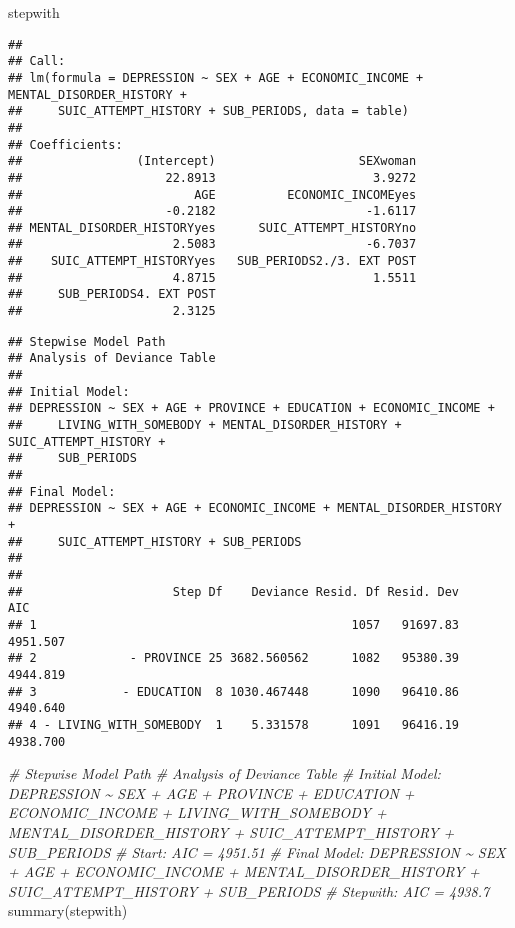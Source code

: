 \documentclass[
]{book}
\newenvironment{Shaded}{\begin{snugshade}}{\end{snugshade}}
\newcommand{\CommentTok}[1]{\textcolor[rgb]{0.56,0.35,0.01}{\textit{#1}}}
\newcommand{\FunctionTok}[1]{\textcolor[rgb]{0.00,0.00,0.00}{#1}}
\newcommand{\NormalTok}[1]{#1}
\newcommand{\SpecialCharTok}[1]{\textcolor[rgb]{0.00,0.00,0.00}{#1}}
\begin{document}
\begin{Shaded}
\begin{Highlighting}[]
\NormalTok{stepwith}
\end{Highlighting}
\end{Shaded}

\begin{verbatim}
## 
## Call:
## lm(formula = DEPRESSION ~ SEX + AGE + ECONOMIC_INCOME + MENTAL_DISORDER_HISTORY + 
##     SUIC_ATTEMPT_HISTORY + SUB_PERIODS, data = table)
## 
## Coefficients:
##                (Intercept)                    SEXwoman  
##                    22.8913                      3.9272  
##                        AGE          ECONOMIC_INCOMEyes  
##                    -0.2182                     -1.6117  
## MENTAL_DISORDER_HISTORYyes      SUIC_ATTEMPT_HISTORYno  
##                     2.5083                     -6.7037  
##    SUIC_ATTEMPT_HISTORYyes   SUB_PERIODS2./3. EXT POST  
##                     4.8715                      1.5511  
##     SUB_PERIODS4. EXT POST  
##                     2.3125
\end{verbatim}

\begin{Shaded}
\end{Shaded}

\begin{verbatim}
## Stepwise Model Path 
## Analysis of Deviance Table
## 
## Initial Model:
## DEPRESSION ~ SEX + AGE + PROVINCE + EDUCATION + ECONOMIC_INCOME + 
##     LIVING_WITH_SOMEBODY + MENTAL_DISORDER_HISTORY + SUIC_ATTEMPT_HISTORY + 
##     SUB_PERIODS
## 
## Final Model:
## DEPRESSION ~ SEX + AGE + ECONOMIC_INCOME + MENTAL_DISORDER_HISTORY + 
##     SUIC_ATTEMPT_HISTORY + SUB_PERIODS
## 
## 
##                     Step Df    Deviance Resid. Df Resid. Dev      AIC
## 1                                            1057   91697.83 4951.507
## 2             - PROVINCE 25 3682.560562      1082   95380.39 4944.819
## 3            - EDUCATION  8 1030.467448      1090   96410.86 4940.640
## 4 - LIVING_WITH_SOMEBODY  1    5.331578      1091   96416.19 4938.700
\end{verbatim}

\begin{Shaded}
\begin{Highlighting}[]
\CommentTok{\# Stepwise Model Path }
\CommentTok{\# Analysis of Deviance Table}
\CommentTok{\# Initial Model: DEPRESSION \textasciitilde{} SEX + AGE + PROVINCE + EDUCATION + ECONOMIC\_INCOME + LIVING\_WITH\_SOMEBODY + MENTAL\_DISORDER\_HISTORY + SUIC\_ATTEMPT\_HISTORY + SUB\_PERIODS}
\CommentTok{\# Start:  AIC = 4951.51}
\CommentTok{\# Final Model: DEPRESSION \textasciitilde{} SEX + AGE + ECONOMIC\_INCOME + MENTAL\_DISORDER\_HISTORY + SUIC\_ATTEMPT\_HISTORY + SUB\_PERIODS}
\CommentTok{\# Stepwith:  AIC = 4938.7}
\FunctionTok{summary}\NormalTok{(stepwith)}
\end{Highlighting}
\end{Shaded}
\end{document}
